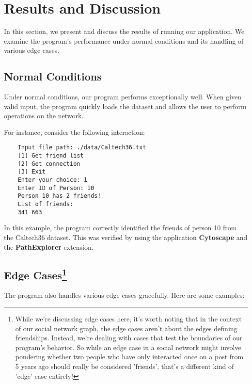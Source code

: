 \section*{Results and Discussion}

In this section, we present and discuss the results of running our application. We examine the program's performance under normal conditions and its handling of various edge cases.

\subsection*{Normal Conditions}

Under normal conditions, our program performs exceptionally well. When given valid input, the program quickly loads the dataset and allows the user to perform operations on the network.

For instance, consider the following interaction:

\begin{verbatim}
	Input file path: ./data/Caltech36.txt
	[1] Get friend list
	[2] Get connection
	[3] Exit
	Enter your choice: 1
	Enter ID of Person: 10
	Person 10 has 2 friends!
	List of friends:
	341 663
\end{verbatim}

In this example, the program correctly identified the friends of person 10 from the Caltech36 dataset. This was verified by using the application \textbf{Cytoscape} and the \textbf{PathExplorer} extension.\cite{shannon2003cytoscape}

\subsection*{Edge Cases\footnote{While we're discussing edge cases here, it's worth noting that in the context of our social network graph, the edge cases aren't about the edges defining friendships. Instead, we're dealing with cases that test the boundaries of our program's behavior. So while an edge case in a social network might involve pondering whether two people who have only interacted once on a post from 5 years ago should really be considered 'friends', that's a different kind of 'edge' case entirely!}}

The program also handles various edge cases gracefully. Here are some examples:

